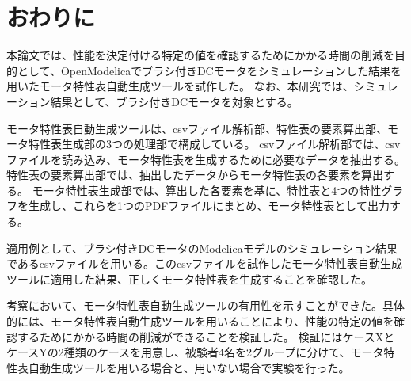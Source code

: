 \documentclass[uplatex, 10pt, a4p]{jsarticle}
\begin{document}

\section{おわりに}
本論文では、性能を決定付ける特定の値を確認するためにかかる時間の削減を目的として、OpenModelicaでブラシ付きDCモータをシミュレーションした結果を用いたモータ特性表自動生成ツールを試作した。
なお、本研究では、シミュレーション結果として、ブラシ付きDCモータを対象とする。

モータ特性表自動生成ツールは、csvファイル解析部、特性表の要素算出部、モータ特性表生成部の3つの処理部で構成している。
csvファイル解析部では、csvファイルを読み込み、モータ特性表を生成するために必要なデータを抽出する。特性表の要素算出部では、抽出したデータからモータ特性表の各要素を算出する。
モータ特性表生成部では、算出した各要素を基に、特性表と4つの特性グラフを生成し、これらを1つのPDFファイルにまとめ、モータ特性表として出力する。

適用例として、ブラシ付きDCモータのModelicaモデルのシミュレーション結果であるcsvファイルを用いる。このcsvファイルを試作したモータ特性表自動生成ツールに適用した結果、正しくモータ特性表を生成することを確認した。

考察において、モータ特性表自動生成ツールの有用性を示すことができた。具体的には、モータ特性表自動生成ツールを用いることにより、性能の特定の値を確認するためにかかる時間の削減ができることを検証した。
検証にはケースXとケースYの2種類のケースを用意し、被験者4名を2グループに分けて、モータ特性表自動生成ツールを用いる場合と、用いない場合で実験を行った。
\end{document}
